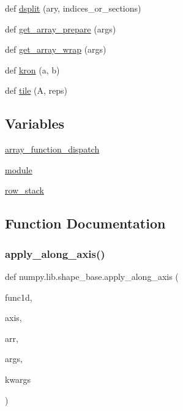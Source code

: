 \begin{DoxyCompactItemize}
def \hyperlink{namespacenumpy_1_1lib_1_1shape__base_a3e9f077fad5afa6186a0e5bb79eae429}{dsplit} (ary, indices\+\_\+or\+\_\+sections)
\item 
def \hyperlink{namespacenumpy_1_1lib_1_1shape__base_ad23034fce52191e2a66250d5811f9516}{get\+\_\+array\+\_\+prepare} (args)
\item 
def \hyperlink{namespacenumpy_1_1lib_1_1shape__base_a56de37acb0e84e4c44c5d9eb2503ae1a}{get\+\_\+array\+\_\+wrap} (args)
\item 
def \hyperlink{namespacenumpy_1_1lib_1_1shape__base_af6e6226bca1c5438f27665971f916196}{kron} (a, b)
\item 
def \hyperlink{namespacenumpy_1_1lib_1_1shape__base_a04f3685035c7fa6527780bab898b8a7f}{tile} (A, reps)
\end{DoxyCompactItemize}
\subsection*{Variables}
\begin{DoxyCompactItemize}
\item 
\hyperlink{namespacenumpy_1_1lib_1_1shape__base_ad9a2d886baff0bea9193f85485a753a1}{array\+\_\+function\+\_\+dispatch}
\item 
\hyperlink{namespacenumpy_1_1lib_1_1shape__base_ab703b799ede8879a02e521346f5a25c5}{module}
\item 
\hyperlink{namespacenumpy_1_1lib_1_1shape__base_a87dc9cba9a65818cea26b0b308bdde12}{row\+\_\+stack}
\end{DoxyCompactItemize}


\subsection{Function Documentation}
\mbox{\label{namespacenumpy_1_1lib_1_1shape__base_a5f60485d92eeebf40d74ade43051bef2}} 
\subsubsection{\texorpdfstring{apply\+\_\+along\+\_\+axis()}{apply\_along\_axis()}}
{\footnotesize\ttfamily def numpy.\+lib.\+shape\+\_\+base.\+apply\+\_\+along\+\_\+axis (\begin{DoxyParamCaption}\item[{}]{func1d,  }\item[{}]{axis,  }\item[{}]{arr,  }\item[{}]{args,  }\item[{}]{kwargs }\end{DoxyParamCaption})}

